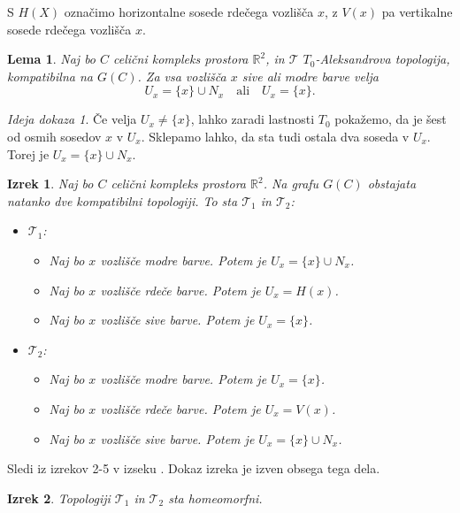 \documentclass[a4paper, 12pt]{book}
\newtheorem{theorem}{Izrek}[section]
\newtheorem{lemma}{Lema}[section]
\theoremstyle{definition}
\theoremstyle{remark}
\newtheorem*{sketch}{Ideja dokaza}
\begin{document}
S $H(X)$ označimo horizontalne sosede rdečega vozlišča $x$, z $V(x)$ pa vertikalne
sosede rdečega vozlišča $x$.\\
\begin{lemma}
  Naj bo $C$ celični kompleks prostora $\mathbb{R}^2$, in $\mathcal{T}$ $T_0$-Aleksandrova
  topologija, kompatibilna na $G(C)$. Za vsa vozlišča $x$ sive ali modre barve velja
  \[U_x = \{x\} \cup N_x \quad \text{ali} \quad U_x = \{x\}\text{.}\]
\end{lemma}
\begin{sketch}
Če velja $U_x \neq \{x\}$, lahko zaradi lastnosti $T_0$ pokažemo, da je šest od
osmih sosedov $x$ v $U_x$. Sklepamo lahko, da sta tudi ostala dva soseda v $U_x$.
Torej je $U_x = \{x\} \cup N_x$.
\end{sketch}

\begin{theorem}
  Naj bo $C$ celični kompleks prostora $\mathbb{R}^2$. Na grafu $G(C)$ obstajata
  natanko dve kompatibilni topologiji. To sta $\mathcal{T}_1$ in $\mathcal{T}_2$:
  \begin{itemize}
    \item $\mathcal{T}_1$:
      \begin{itemize}
        \item Naj bo $x$ vozlišče modre barve. Potem je $U_x = \{x\} \cup N_x$.
        \item Naj bo $x$ vozlišče rdeče barve. Potem je $U_x = H(x)$.
        \item Naj bo $x$ vozlišče sive barve. Potem je $U_x = \{x\}$.
      \end{itemize}
      \item $\mathcal{T}_2$:
      \begin{itemize}
        \item Naj bo $x$ vozlišče modre barve. Potem je $U_x = \{x\}$.
        \item Naj bo $x$ vozlišče rdeče barve. Potem je $U_x = V(x)$.
        \item Naj bo $x$ vozlišče sive barve. Potem je $U_x = \{x\} \cup N_x$.
      \end{itemize}
  \end{itemize}
\end{theorem}
Sledi iz izrekov 2-5 v izseku .
Dokaz izreka je izven obsega tega dela.
\begin{theorem}
  Topologiji $\mathcal{T}_1$ in $\mathcal{T}_2$ sta homeomorfni.
\end{theorem}
\end{document}
